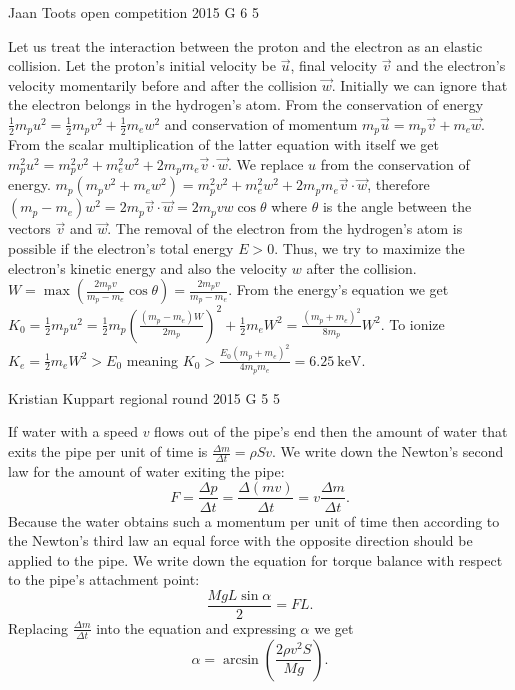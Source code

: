 \documentclass[11pt]{article}
\begin{document}
{Jaan Toots} %
{open competition} %
{2015} %
{G 6} %
{5} %
{

\ifEngSolution
Let us treat the interaction between the proton and the electron as an elastic collision. Let the proton’s initial velocity be $\vec{u}$, final velocity $\vec{v}$ and the electron’s velocity momentarily before and after the collision $\vec{w}$. Initially we can ignore that the electron belongs in the hydrogen’s atom. From the conservation of energy $\frac{1}{2}m_p u^2 = \frac{1}{2}m_p v^2 + \frac{1}{2}m_e w^2$ and conservation of momentum $m_p \vec{u} = m_p \vec{v} + m_e \vec{w}$. From the scalar multiplication of the latter equation with itself we get $m_p^2 u^2 = m_p^2 v^2 + m_e^2 w^2 + 2 m_p m_e \vec{v}\cdot \vec{w}$. We replace $u$ from the conservation of energy. $m_p ( m_p v^2 + m_e w^2 ) = m_p^2 v^2 + m_e^2 w^2 + 2 m_p m_e \vec{v}\cdot \vec{w}$, therefore $( m_p - m_e ) w^2 = 2 m_p \vec{v}\cdot\vec{w} = 2 m_p vw \cos\theta$ where $\theta$ is the angle between the vectors $\vec{v}$ and $\vec{w}$. The removal of the electron from the hydrogen’s atom is possible if the electron’s total energy $E>0$. Thus, we try to maximize the electron’s kinetic energy and also the velocity $w$ after the collision. $W = \max\left(\frac{2 m_p v}{m_p - m_e}\cos\theta\right) = \frac{2 m_p v}{m_p - m_e}$. From the energy’s equation we get $K_0 = \frac{1}{2}m_p u^2 = \frac{1}{2}m_p \left(\frac{( m_p - m_e ) W}{2 m_p}\right)^2 + \frac{1}{2}m_e W^2 = \frac{(m_p + m_e)^2}{8 m_p} W^2$. To ionize $K_e = \frac{1}{2}m_e W^2 > E_0$ meaning $K_0 > \frac{E_0 (m_p + m_e)^2}{4 m_p m_e} = \SI{6.25}{\kilo\electronvolt}$.
\fi
}

{Kristian Kuppart} %
{regional round} %
{2015} %
{G 5} %
{5} %
{

\ifEngSolution
If water with a speed $v$ flows out of the pipe’s end then the amount of water that exits the pipe per unit of time is $\frac{\Delta m}{\Delta t}=\rho S v$. We write down the Newton’s second law for the amount of water exiting the pipe:
\[ F=\frac{\Delta p}{\Delta t}=\frac{\Delta(mv)}{\Delta t}=v \frac{\Delta m}{\Delta t}. \] 
Because the water obtains such a momentum per unit of time then according to the Newton’s third law an equal force with the opposite direction should be applied to the pipe. We write down the equation for torque balance with respect to the pipe’s attachment point:
\[ \frac{MgL\sin \alpha}{2}=FL. \] 
Replacing $\frac{\Delta m}{\Delta t}$ into the equation and expressing $\alpha$ we get
\[ \alpha=\arcsin (\frac{2\rho v^2 S}{Mg}). \]
\fi
}
\end{document}
